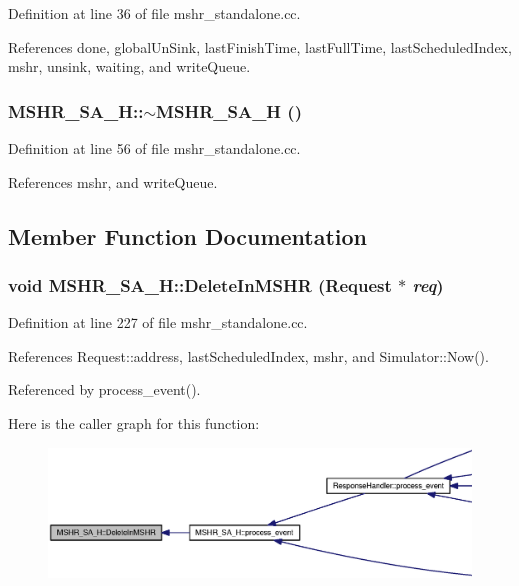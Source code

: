 Definition at line 36 of file mshr\_\-standalone.cc.

References done, globalUnSink, lastFinishTime, lastFullTime, lastScheduledIndex, mshr, unsink, waiting, and writeQueue.
\subsubsection[{$\sim$MSHR\_\-SA\_\-H}]{\setlength{\rightskip}{0pt plus 5cm}MSHR\_\-SA\_\-H::$\sim$MSHR\_\-SA\_\-H ()}\label{classMSHR__SA__H_cad9ecf446acda5560f5e05522725d14}




Definition at line 56 of file mshr\_\-standalone.cc.

References mshr, and writeQueue.

\subsection{Member Function Documentation}
\subsubsection[{DeleteInMSHR}]{\setlength{\rightskip}{0pt plus 5cm}void MSHR\_\-SA\_\-H::DeleteInMSHR ({\bf Request} $\ast$ {\em req})}\label{classMSHR__SA__H_99c549f30ac6d47e184f9d5514b30c55}




Definition at line 227 of file mshr\_\-standalone.cc.

References Request::address, lastScheduledIndex, mshr, and Simulator::Now().

Referenced by process\_\-event().

Here is the caller graph for this function:\nopagebreak
\begin{figure}[H]
\begin{center}
\leavevmode
\includegraphics[width=420pt]{classMSHR__SA__H_99c549f30ac6d47e184f9d5514b30c55_icgraph}
\end{center}
\end{figure}
